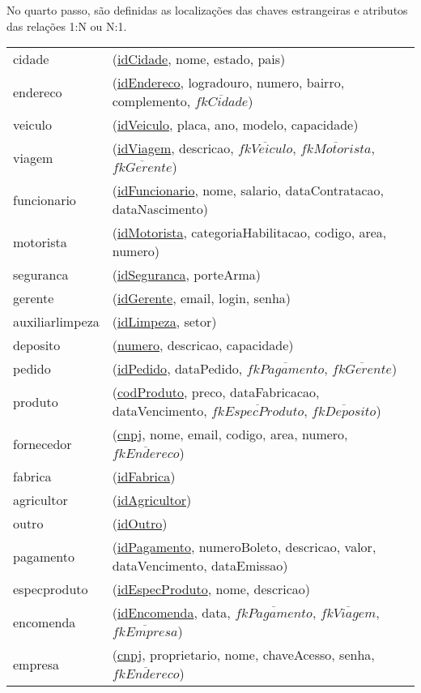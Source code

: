 \documentclass[12pt, onecolumn, titlepage]{article}
\begin{document}
\newpage
No quarto passo, são definidas as localizações das chaves estrangeiras e atributos das relações 1:N ou N:1.

\begin{table}[htb!]
\begin{center}
\begin{tabular}{p{2.5cm} p{10.5cm}}
cidade & (\underline{idCidade}, nome, estado, pais) \\
endereco & (\underline{idEndereco}, logradouro, numero, bairro, complemento, $\overline{fkCidade}$) \\
veiculo & (\underline{idVeiculo}, placa, ano, modelo, capacidade) \\
viagem & (\underline{idViagem}, descricao, $\overline{fkVeiculo}$, $\overline{fkMotorista}$, $\overline{fkGerente}$) \\
funcionario & (\underline{idFuncionario}, nome, salario, dataContratacao, dataNascimento)\\
motorista & (\underline{idMotorista}, categoriaHabilitacao, codigo, area, numero)\\
seguranca & (\underline{idSeguranca}, porteArma)\\
gerente & (\underline{idGerente}, email, login, senha)\\
auxiliarlimpeza & (\underline{idLimpeza}, setor)\\
deposito & (\underline{numero}, descricao, capacidade)\\
pedido & (\underline{idPedido}, dataPedido, $\overline{fkPagamento}$, $\overline{fkGerente}$)\\
produto & (\underline{codProduto}, preco, dataFabricacao, dataVencimento, $\overline{fkEspecProduto}$, $\overline{fkDeposito}$)\\
fornecedor & (\underline{cnpj}, nome, email, codigo, area, numero, $\overline{fkEndereco}$)\\
fabrica & (\underline{idFabrica})\\
agricultor & (\underline{idAgricultor})\\
outro & (\underline{idOutro})\\
pagamento & (\underline{idPagamento}, numeroBoleto, descricao, valor, dataVencimento, dataEmissao)\\
especproduto & (\underline{idEspecProduto}, nome, descricao)\\
encomenda & (\underline{idEncomenda}, data, $\overline{fkPagamento}$, $\overline{fkViagem}$, $\overline{fkEmpresa}$)\\
empresa & (\underline{cnpj}, proprietario, nome, chaveAcesso, senha, $\overline{fkEndereco}$)
\end{tabular}
\end{center}
\end{table}
\end{document}
